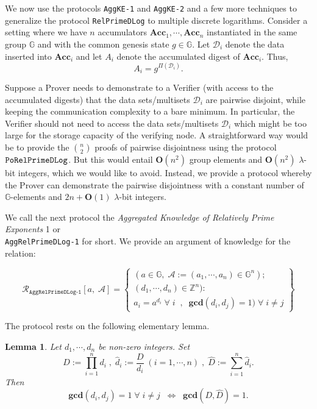 \documentclass[11pt, lettersize, notitlepage, leqno, footskip=0.6cm]{article}
\newcommand{\bz}{\mathbb Z}
\newcommand{\pl}{\prod\limits}
\newcommand{\slim}{\sum\limits}
\newcommand{\ttt}{\texttt}
\newcommand{\Acc}{\mbf{Acc}}
\newcommand{\LRA}{\Longleftrightarrow}
\newcommand{\mc}{\mathcal}
\newcommand{\mb}{\mathbb}
\newcommand{\mbf}{\mathbf}
\newcommand{\lam}{\lambda}
\newcommand{\what}{\widehat}
\newcommand{\bO}{\mbf{O}}
\newcommand{\vs}{\vspace{-0.15cm}}
\newcommand{\noin}{\noindent}
\newcommand{\GCD}{\mbf{gcd}}
\newtheorem{Lem}[Thm]{Lemma}
\numberwithin{equation}{section}
\begin{document}
We now use the protocols \verb|AggKE-1| and \verb|AggKE-2| and a few more techniques to generalize the protocol \verb|RelPrimeDLog| to multiple discrete logarithms. Consider a setting where we have $n$ accumulators $\Acc_1,\cdots,\Acc_n$ instantiated in the same group $\mb{G}$ and with the common genesis state $g\in\mb{G}$. Let $\mc{D}_i$ denote the data inserted into $\Acc_i$ and let $A_i$ denote the accumulated digest of $\Acc_i$. Thus, \vs $$A_i = g^{\Pi(\mc{D}_i)} .$$ 

Suppose a Prover needs to demonstrate to a Verifier (with access to the accumulated digests) that the data sets/multisets $\mc{D}_i$ are pairwise disjoint, while keeping the communication complexity to a bare minimum. In particular, the Verifier should not need to access the data sets/multisets $\mc{D}_i$ which might be too large for the storage capacity of the verifying node. A straightforward way would be to provide the $n\choose 2$ proofs of pairwise disjointness using the protocol $\tt{PoRelPrimeDLog}$. But this would entail $\mbf{O}(n^2)$ group elements and $\mbf{O}(n^2)$ $\lam$-bit integers, which we would like to avoid. Instead, we provide a protocol whereby the Prover can demonstrate the pairwise disjointness with a constant number of $\mb{G}$-elements and $2n+\bO(1)$ $\lam$-bit integers.

We call the next protocol the \textit{Aggregated Knowledge of Relatively Prime Exponents} 1 or\\ \verb|AggRelPrimeDLog-1| for short. We provide an argument of knowledge for the relation:

\[
  \mc{R}_{\ttt{AggRelPrimeDLog-1}}[a,\; \mc{A}] = \left\{\begin{array}{l}
    (a\in\mb{G},\;  \mc{A}:=(a_1,\cdots, a_n)\in\mb{G}^n);\\
    (d_1,\cdots,d_n)\in\bz^n): \\
    a_i = a^{d_i}\;\forall\;i\;\;,\;\; \GCD(d_i, d_j) = 1)\;\forall \;i\neq j   	
  \end{array}\right\}
\] 

\noin The protocol rests on the following elementary lemma.

\begin{Lem}\label{lcm} Let $d_1,\cdots,d_n$ be non-zero integers. Set \vs $$D:= \pl_{i=1}^n d_i\;,\; \what{d}_i:= \frac{D}{d_i}\;(i=1,\cdots,n) \;,\;\what{D}:= \slim_{i=1}^n \what{d}_i.$$ Then \vs $$\GCD(d_i,d_j)=1\;\forall\;i\neq j\;\; \LRA \;\; \GCD(D, \what{D}) = 1 .$$\end{Lem}
\end{document}
